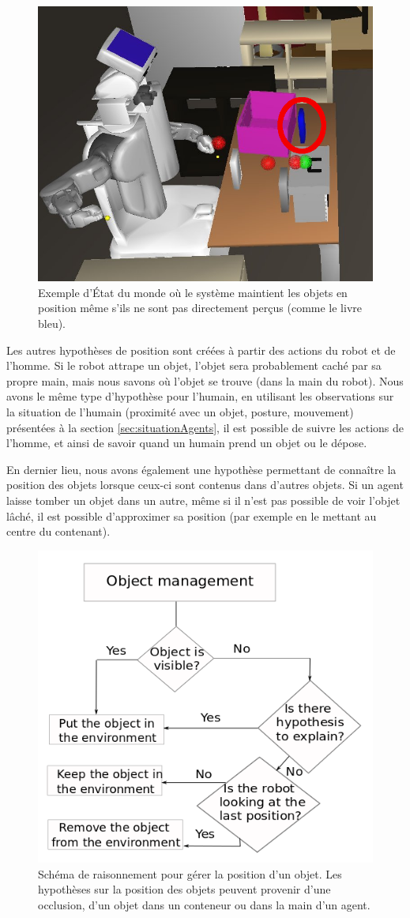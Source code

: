 \documentclass[a4paper,11pt,twoside]{StyleThese}
\begin{document}
\begin{figure}[ht!]
 \centering
  \includegraphics[width=0.69\linewidth]{./img/occluded.png} 
  \caption {Exemple d'État du monde où le système maintient les objets en position même s'ils ne sont pas directement perçus (comme le livre bleu).}
  \label{fig:occluded}
\end{figure}

Les autres hypothèses de position sont créées à partir des actions du robot et de l'homme. Si le robot attrape un objet, l'objet sera probablement caché par sa propre main, mais nous savons où l'objet se trouve (dans la main du robot).
Nous avons le même type d'hypothèse pour l'humain, en utilisant les observations sur la situation de l'humain (proximité avec un objet, posture, mouvement) présentées à la section \ref{sec:situationAgents}, il est possible de suivre les actions de l'homme, et ainsi de savoir quand un humain prend un objet ou le dépose.

En dernier lieu, nous avons également une hypothèse permettant de connaître la position des objets lorsque ceux-ci sont contenus dans d'autres objets.
Si un agent laisse tomber un objet dans un autre, même si il n'est pas possible de voir l'objet lâché, il est possible d'approximer sa position (par exemple en le mettant au centre du contenant).

\begin{figure}[ht!]
 \centering
  \includegraphics[width=0.70\linewidth]{./img/hypothesis.png} 
  \caption {Schéma de raisonnement pour gérer la position d'un objet. Les hypothèses sur la position des objets peuvent provenir d'une occlusion, d'un objet dans un conteneur ou dans la main d'un agent.}
  \label{obj_manag_fg}
\end{figure}
\end{document}
